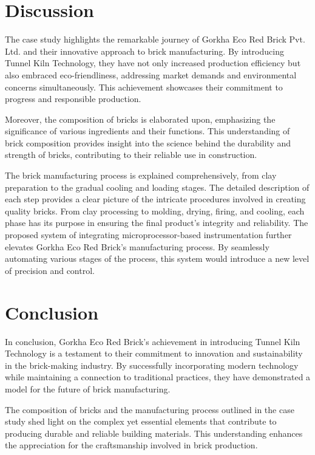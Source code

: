 \section{Discussion}
The case study highlights the remarkable journey of Gorkha Eco Red Brick Pvt. Ltd. and their innovative approach to brick manufacturing. By introducing Tunnel Kiln Technology, they have not only increased production efficiency but also embraced eco-friendliness, addressing market demands and environmental concerns simultaneously. This achievement showcases their commitment to progress and responsible production.

Moreover, the composition of bricks is elaborated upon, emphasizing the significance of various ingredients and their functions. This understanding of brick composition provides insight into the science behind the durability and strength of bricks, contributing to their reliable use in construction.

The brick manufacturing process is explained comprehensively, from clay preparation to the gradual cooling and loading stages. The detailed description of each step provides a clear picture of the intricate procedures involved in creating quality bricks. From clay processing to molding, drying, firing, and cooling, each phase has its purpose in ensuring the final product's integrity and reliability. The proposed system of integrating microprocessor-based instrumentation further elevates Gorkha Eco Red Brick's manufacturing process. By seamlessly automating various stages of the process, this system would introduce a new level of precision and control.

\section{Conclusion}
In conclusion, Gorkha Eco Red Brick's achievement in introducing Tunnel Kiln Technology is a testament to their commitment to innovation and sustainability in the brick-making industry. By successfully incorporating modern technology while maintaining a connection to traditional practices, they have demonstrated a model for the future of brick manufacturing.

The composition of bricks and the manufacturing process outlined in the case study shed light on the complex yet essential elements that contribute to producing durable and reliable building materials. This understanding enhances the appreciation for the craftsmanship involved in brick production.